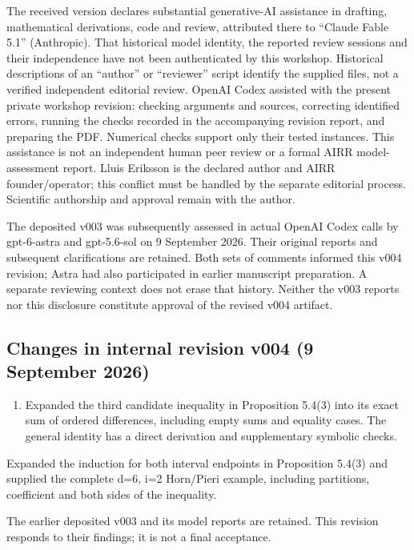 \documentclass[
  11pt,
  a4paper,
]{article}
\providecommand{\tightlist}{%
  \setlength{\itemsep}{0pt}\setlength{\parskip}{0pt}}
\begin{document}
The received version declares substantial generative-AI assistance in
drafting, mathematical derivations, code and review, attributed there to
``Claude Fable 5.1'' (Anthropic). That historical model identity, the
reported review sessions and their independence have not been
authenticated by this workshop. Historical descriptions of an ``author''
or ``reviewer'' script identify the supplied files, not a verified
independent editorial review. OpenAI Codex assisted with the present
private workshop revision: checking arguments and sources, correcting
identified errors, running the checks recorded in the accompanying
revision report, and preparing the PDF. Numerical checks support only
their tested instances. This assistance is not an independent human peer
review or a formal AIRR model-assessment report. Lluis Eriksson is the
declared author and AIRR founder/operator; this conflict must be handled
by the separate editorial process. Scientific authorship and approval
remain with the author.

The deposited v003 was subsequently assessed in actual OpenAI Codex
calls by gpt-6-astra and gpt-5.6-sol on 9 September 2026. Their original
reports and subsequent clarifications are retained. Both sets of
comments informed this v004 revision; Astra had also participated in
earlier manuscript preparation. A separate reviewing context does not
erase that history. Neither the v003 reports nor this disclosure
constitute approval of the revised v004 artifact.

\subsection{Changes in internal revision v004 (9 September
2026)}\label{changes-in-internal-revision-v004-9-september-2026}

\begin{enumerate}
\def\labelenumi{\arabic{enumi}.}
\tightlist
\item
  Expanded the third candidate inequality in Proposition 5.4(3) into its
  exact sum of ordered differences, including empty sums and equality
  cases. The general identity has a direct derivation and supplementary
  symbolic checks.
\end{enumerate}

Expanded the induction for both interval endpoints in Proposition 5.4(3)
and supplied the complete d=6, i=2 Horn/Pieri example, including
partitions, coefficient and both sides of the inequality.

The earlier deposited v003 and its model reports are retained. This
revision responds to their findings; it is not a final acceptance.
\end{document}
